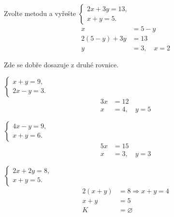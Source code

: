 \documentclass[11pt,a4paper]{article}
\begin{document}
\begin{prikladReseniBox}[title={Příklad 2}]
Zvolte metodu a vyřešte $\begin{cases}2x+3y=13,\\x+y=5.\end{cases}$
\tcblower
\begin{align*}
x&=5-y \\
 2(5-y)+3y&=13 \\
 y&=3,\quad x=2
\end{align*}

Zde se dobře dosazuje z druhé rovnice.
\end{prikladReseniBox}
\begin{zadaniReseniBox}[title={Samostatná práce 1}]
$\begin{cases}x+y=9,\\2x-y=3.\end{cases}$
\tcblower
\begin{align*}
3x&=12 \\
 x&=4,\quad y=5
\end{align*}
\end{zadaniReseniBox}
\begin{zadaniReseniBox}[title={Samostatná práce 2}]
$\begin{cases}4x-y=9,\\x+y=6.\end{cases}$
\tcblower
\begin{align*}
5x&=15 \\
 x&=3,\quad y=3
\end{align*}
\end{zadaniReseniBox}
\begin{zadaniReseniBox}[title={Samostatná práce 3}]
$\begin{cases}2x+2y=8,\\x+y=5.\end{cases}$
\tcblower
\begin{align*}
2(x+y)&=8\Rightarrow x+y=4 \\
 x+y&=5 \\
 K&=\varnothing
\end{align*}
\end{zadaniReseniBox}
\end{document}
